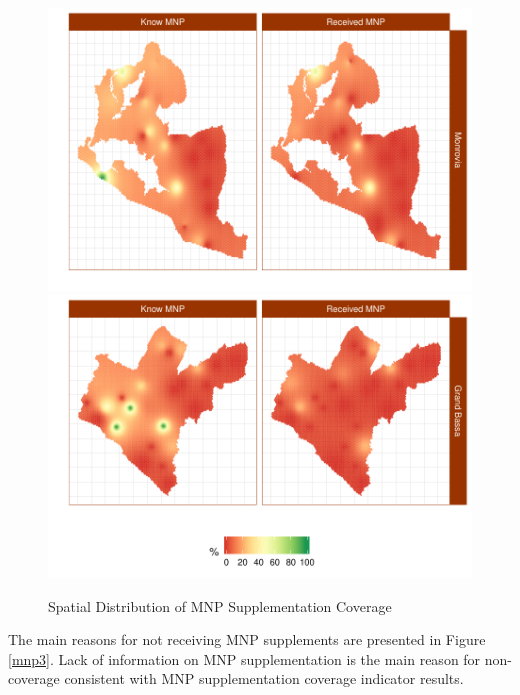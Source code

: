 \documentclass[12pt,a4paper]{article}
\begin{document}
\begin{figure}[H]

{\centering \includegraphics{liberiaCoverageReport_files/figure-latex/mnpMap-1} \includegraphics{liberiaCoverageReport_files/figure-latex/mnpMap-2} 

}

\caption{Spatial Distribution of MNP Supplementation Coverage}\label{fig:mnpMap}
\end{figure}

The main reasons for not receiving MNP supplements are presented in Figure \ref{mnp3}. Lack of information on MNP supplementation is the main reason for non-coverage consistent with MNP supplementation coverage indicator results.
\end{document}
